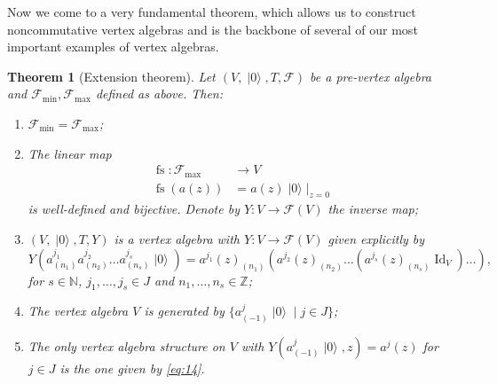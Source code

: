 \documentclass[a4paper, 12pt, reqno]{amsart}
\newtheorem{theorem}{Theorem}[subsection]
\theoremstyle{remark}
\numberwithin{equation}{subsection}
\DeclareMathOperator{\Id}{Id}
\DeclareMathOperator{\vac}{|0\rangle}
\DeclareMathOperator{\fs}{fs}
\begin{document}
Now we come to a very fundamental theorem, which allows us to construct noncommutative vertex algebras and is the backbone of several of our most important examples of vertex algebras.
\begin{theorem}[Extension theorem]
  \label{thr:14}
  Let $(V, \vac, T, \mathcal{F})$ be a pre-vertex algebra and $\mathcal{F}_{\min}, \mathcal{F}_{\max}$ defined as above.
  Then:
  \begin{enumerate}
  \item $\mathcal{F}_{\min} = \mathcal{F}_{\max}$;
  \item The linear map
    \begin{align*}
      \fs: \mathcal{F}_{\max} &\to V \\
      \fs(a(z)) &= a(z)\vac|_{z = 0}
    \end{align*}
    is well-defined and bijective.
    Denote by $Y: V \to \mathcal{F}(V)$ the inverse map;
  \item $(V, \vac, T, Y)$ is a vertex algebra with $Y: V \to \mathcal{F}(V)$ given explicitly by
    \begin{equation}
      \label{eq:14}
      Y(a^{j_1}_{(n_1)}a^{j_2}_{(n_2)}\dots a^{j_s}_{(n_s)}\vac) = a^{j_1}(z)_{(n_1)}(a^{j_2}(z)_{(n_2)}\dots (a^{j_s}(z)_{(n_s)}\Id_V)\dots),
    \end{equation}
    for $s \in \mathbb{N}$, $j_1, \dots, j_s \in J$ and $n_1, \dots, n_s \in \mathbb{Z}$;
  \item The vertex algebra $V$ is generated by $\{a^j_{(-1)}\vac \mid j \in J\}$;
  \item The only vertex algebra structure on $V$ with $Y(a^j_{(-1)}\vac, z) = a^j(z)$ for $j \in J$ is the one given by \eqref{eq:14}.
  \end{enumerate}
\end{theorem}
\end{document}
